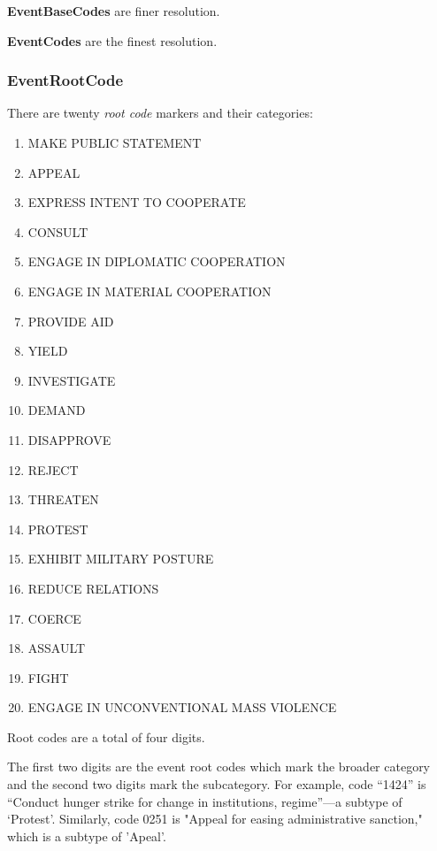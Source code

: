 \par \textbf{EventBaseCodes} are finer resolution. %

\par \textbf{EventCodes} are the finest resolution.

\subsubsection{EventRootCode}
There are twenty \textit{root code} markers and their categories: 
\begin{enumerate} \item MAKE PUBLIC STATEMENT \item APPEAL \item EXPRESS INTENT TO COOPERATE \item CONSULT  \item ENGAGE IN DIPLOMATIC COOPERATION \item ENGAGE IN MATERIAL COOPERATION \item  PROVIDE AID \item  YIELD \item  INVESTIGATE \item DEMAND \item DISAPPROVE \item REJECT \item THREATEN \item PROTEST \item EXHIBIT MILITARY POSTURE \item REDUCE RELATIONS  \item COERCE \item ASSAULT \item FIGHT \item ENGAGE IN UNCONVENTIONAL MASS VIOLENCE \end{enumerate} 

\par Root codes are a total of four digits. %

The first two digits are the event root codes which mark the broader category and the second two digits mark the subcategory. 
For example, code “1424” is “Conduct hunger strike for change in institutions, regime”—a subtype of ‘Protest’. Similarly, code 0251 is "Appeal for easing administrative sanction," which is a subtype of 'Apeal'. %

